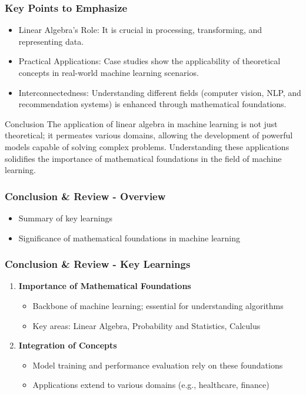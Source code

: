 \documentclass{beamer}
\begin{document}
\begin{frame}[fragile]
    \frametitle{Key Points to Emphasize}
    \begin{itemize}
        \item Linear Algebra's Role: It is crucial in processing, transforming, and representing data.
        \item Practical Applications: Case studies show the applicability of theoretical concepts in real-world machine learning scenarios.
        \item Interconnectedness: Understanding different fields (computer vision, NLP, and recommendation systems) is enhanced through mathematical foundations.
    \end{itemize}

    \begin{block}{Conclusion}
        The application of linear algebra in machine learning is not just theoretical; it permeates various domains, allowing the development of powerful models capable of solving complex problems. Understanding these applications solidifies the importance of mathematical foundations in the field of machine learning.
    \end{block}
\end{frame}

\begin{frame}[fragile]
    \frametitle{Conclusion \& Review - Overview}
    \begin{itemize}
        \item Summary of key learnings
        \item Significance of mathematical foundations in machine learning
    \end{itemize}
\end{frame}

\begin{frame}[fragile]
    \frametitle{Conclusion \& Review - Key Learnings}
    \begin{enumerate}
        \item \textbf{Importance of Mathematical Foundations}
            \begin{itemize}
                \item Backbone of machine learning; essential for understanding algorithms
                \item Key areas: Linear Algebra, Probability and Statistics, Calculus
            \end{itemize}
        
        \item \textbf{Integration of Concepts}
            \begin{itemize}
                \item Model training and performance evaluation rely on these foundations
                \item Applications extend to various domains (e.g., healthcare, finance)
            \end{itemize}
    \end{enumerate}
\end{frame}
\end{document}
